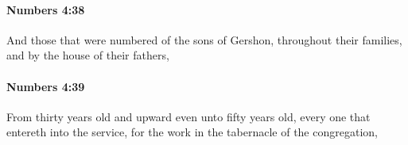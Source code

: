 		\paragraph{Numbers 4:38} %
			\label{NUMBERS-4-38}

			And those that were numbered of the sons of Gershon, throughout their families, and by the house of their fathers,


		\paragraph{Numbers 4:39} %
			\label{NUMBERS-4-39}

			From thirty years old and upward even unto fifty years old, every one that entereth into the service, for the work in the tabernacle of the congregation,



